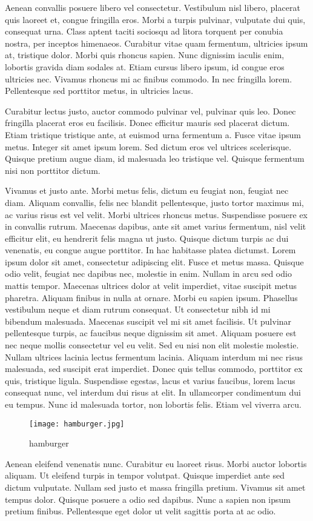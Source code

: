 \documentclass[12pt,a4paper]{article}
\begin{document}
Aenean convallis posuere libero vel consectetur. Vestibulum nisl libero, placerat quis laoreet et, congue fringilla eros. Morbi a turpis pulvinar, vulputate dui quis, consequat urna. Class aptent taciti sociosqu ad litora torquent per conubia nostra, per inceptos himenaeos. Curabitur vitae quam fermentum, ultricies ipsum at, tristique dolor. Morbi quis rhoncus sapien. Nunc dignissim iaculis enim, lobortis gravida diam sodales at. Etiam cursus libero ipsum, id congue eros ultricies nec. Vivamus rhoncus mi ac finibus commodo. In nec fringilla lorem. Pellentesque sed porttitor metus, in ultricies lacus.

Curabitur lectus justo, auctor commodo pulvinar \cite{dwa}vel, pulvinar quis leo. Donec fringilla placerat eros eu facilisis. Donec efficitur mauris sed placerat dictum. Etiam tristique tristique ante, at euismod urna fermentum a. Fusce vitae ipsum metus. Integer sit amet ipsum lorem. Sed dictum eros vel ultrices scelerisque. Quisque pretium augue diam, id malesuada leo tristique vel. Quisque fermentum nisi non porttitor dictum.

Vivamus et justo ante. Morbi metus felis, dictum eu feugiat non, feugiat nec diam. Aliquam convallis, felis nec blandit pellentesque, justo tortor maximus mi, ac varius risus est vel velit. Morbi ultrices rhoncus metus. Suspendisse posuere ex in convallis rutrum. Maecenas dapibus, ante sit amet varius fermentum, nisl velit efficitur elit, eu hendrerit felis magna ut justo. Quisque dictum turpis ac dui venenatis, eu congue augue porttitor. In hac habitasse platea dictumst. Lorem ipsum dolor sit amet, consectetur adipiscing elit. Fusce et metus massa. Quisque odio velit, feugiat nec dapibus nec, molestie in enim. Nullam in arcu sed odio mattis tempor. Maecenas ultrices dolor at velit imperdiet, vitae suscipit metus pharetra. Aliquam finibus in nulla at ornare.
Morbi eu sapien ipsum. \cite{jeden}Phasellus vestibulum neque et diam rutrum consequat. Ut consectetur nibh id mi bibendum malesuada. Maecenas suscipit vel mi sit amet facilisis. Ut pulvinar pellentesque turpis, ac faucibus neque dignissim sit amet. Aliquam posuere est nec neque mollis consectetur vel eu velit. Sed eu nisi non elit molestie molestie. Nullam ultrices lacinia lectus fermentum lacinia. Aliquam interdum mi nec risus malesuada, sed suscipit erat imperdiet. Donec quis tellus commodo, porttitor ex quis, tristique ligula. Suspendisse egestas, lacus et varius faucibus, lorem lacus consequat nunc, vel interdum dui risus at elit. In ullamcorper condimentum dui eu tempus. Nunc id malesuada tortor, non lobortis felis. Etiam vel viverra arcu.
	\begin{figure}[H]
		\centering
		\texttt{[image: hamburger.jpg]}
		\caption{hamburger}
	\end{figure}
 \label{hamburger}
Aenean eleifend venenatis nunc. Curabitur eu laoreet risus. Morbi auctor lobortis aliquam. Ut eleifend turpis in tempor volutpat. Quisque imperdiet ante sed dictum vulputate. Nullam sed justo et massa fringilla pretium. Vivamus sit amet tempus dolor. Quisque posuere a odio sed dapibus. Nunc a sapien non ipsum pretium finibus. Pellentesque eget dolor ut velit sagittis porta at ac odio.
\end{document}
